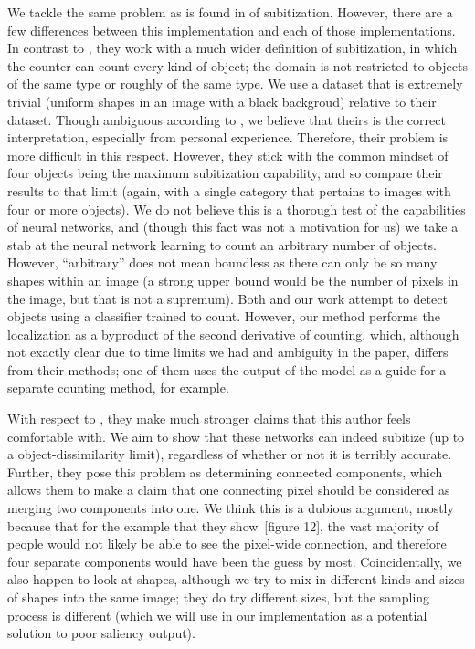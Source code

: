 We tackle the same problem as is found in \cite{Zhang_2015_CVPR, guan2021understanding} of
subitization. However, there are a few differences between this implementation and each of those
implementations. In contrast to \cite{Zhang_2015_CVPR}, they work with a much wider definition of
subitization, in which the counter can count every kind of object; the domain is not restricted to
objects of the same type or roughly of the same type. We use a dataset that is extremely trivial
(uniform shapes in an image with a black backgroud) relative to their dataset. Though ambiguous
according to \cite{subitizingdefinition}, we believe that theirs is the correct interpretation,
especially from personal experience. Therefore, their problem is more difficult in this respect.
However, they stick with the common mindset of four objects being the maximum subitization
capability, and so compare their results to that limit (again, with a single category that pertains
to images with four or more objects). We do not believe this is a thorough test of the capabilities
of neural networks, and (though this fact was not a motivation for us) we take a stab at the neural
network learning to count an arbitrary number of objects. However, ``arbitrary'' does not mean
boundless as there can only be so many shapes within an image (a strong upper bound would be the
number of pixels in the image, but that is not a supremum). Both \cite{Zhang_2015_CVPR} and our work
attempt to detect objects using a classifier trained to count. However, our method performs the
localization as a byproduct of the second derivative of counting, which, although not exactly clear
due to time limits we had and ambiguity in the paper, differs from their methods; one of them uses
the output of the model as a guide for a separate counting method, for example.

With respect to \cite{guan2021understanding}, they make much stronger claims that this author feels
comfortable with. We aim to show that these networks can indeed subitize (up to a
object-dissimilarity limit), regardless of whether or not it is terribly accurate. Further, they
pose this problem as determining connected components, which allows them to make a claim that one
connecting pixel should be considered as merging two components into one. We think this is a dubious
argument, mostly because that for the example that they show~\cite{guan2021understanding}[figure
12], the vast majority of people would not likely be able to see the pixel-wide connection, and
therefore four separate components would have been the guess by most. Coincidentally, we also happen
to look at shapes, although we try to mix in different kinds and sizes of shapes into the same
image; they do try different sizes, but the sampling process is different (which we will use in our
implementation as a potential solution to poor saliency output).






